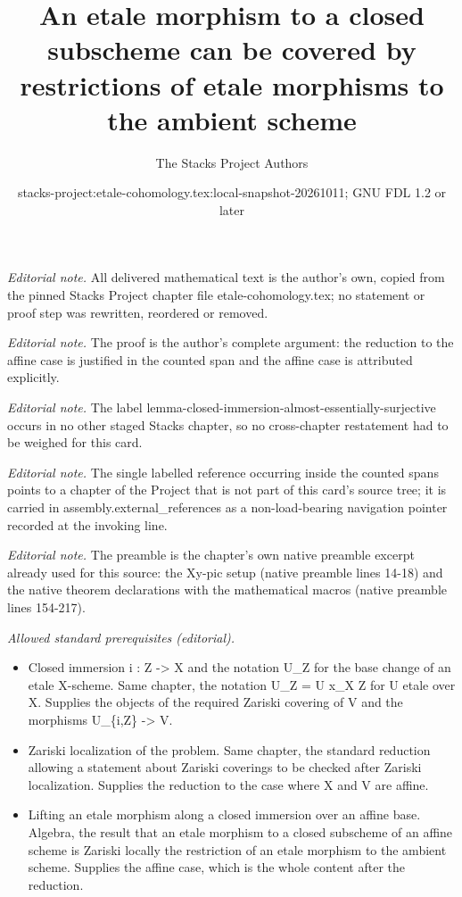 \documentclass[10pt,a4paper]{amsart}
\title{An etale morphism to a closed subscheme can be covered by restrictions of etale morphisms to the ambient scheme}
\author{The Stacks Project Authors}
\date{stacks-project:etale-cohomology.tex:local-snapshot-20261011; GNU FDL 1.2 or later}
\theoremstyle{plain}
\theoremstyle{definition}
\theoremstyle{remark}
\numberwithin{equation}{subsection}
\begin{document}
\maketitle
\noindent\textit{Editorial note.} All delivered mathematical text is the author's own, copied from the pinned Stacks Project chapter file etale-cohomology.tex; no statement or proof step was rewritten, reordered or removed.\par\medskip
\noindent\textit{Editorial note.} The proof is the author's complete argument: the reduction to the affine case is justified in the counted span and the affine case is attributed explicitly.\par\medskip
\noindent\textit{Editorial note.} The label lemma-closed-immersion-almost-essentially-surjective occurs in no other staged Stacks chapter, so no cross-chapter restatement had to be weighed for this card.\par\medskip
\noindent\textit{Editorial note.} The single labelled reference occurring inside the counted spans points to a chapter of the Project that is not part of this card's source tree; it is carried in assembly.external\_references as a non-load-bearing navigation pointer recorded at the invoking line.\par\medskip
\noindent\textit{Editorial note.} The preamble is the chapter's own native preamble excerpt already used for this source: the Xy-pic setup (native preamble lines 14-18) and the native theorem declarations with the mathematical macros (native preamble lines 154-217).\par\medskip
\noindent\textit{Allowed standard prerequisites (editorial).}\begin{itemize}
\item Closed immersion i : Z -> X and the notation U\_Z for the base change of an etale X-scheme. Same chapter, the notation U\_Z = U x\_X Z for U etale over X. Supplies the objects of the required Zariski covering of V and the morphisms U\_\{i,Z\} -> V.
\item Zariski localization of the problem. Same chapter, the standard reduction allowing a statement about Zariski coverings to be checked after Zariski localization. Supplies the reduction to the case where X and V are affine.
\item Lifting an etale morphism along a closed immersion over an affine base. Algebra, the result that an etale morphism to a closed subscheme of an affine scheme is Zariski locally the restriction of an etale morphism to the ambient scheme. Supplies the affine case, which is the whole content after the reduction.
\end{itemize}\medskip
\end{document}
